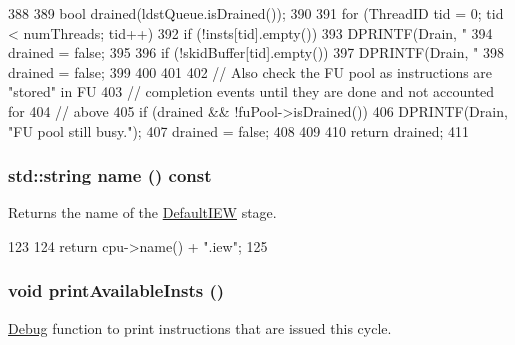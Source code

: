\begin{DoxyCode}
388 {
389     bool drained(ldstQueue.isDrained());
390 
391     for (ThreadID tid = 0; tid < numThreads; tid++) {
392         if (!insts[tid].empty()) {
393             DPRINTF(Drain, "%
394             drained = false;
395         }
396         if (!skidBuffer[tid].empty()) {
397             DPRINTF(Drain, "%
398             drained = false;
399         }
400     }
401 
402     // Also check the FU pool as instructions are "stored" in FU
403     // completion events until they are done and not accounted for
404     // above
405     if (drained && !fuPool->isDrained()) {
406         DPRINTF(Drain, "FU pool still busy.\n");
407         drained = false;
408     }
409 
410     return drained;
411 }
\end{DoxyCode}
\hypertarget{classDefaultIEW_a37627d5d5bba7f4a8690c71c2ab3cb07}{
\subsubsection[{name}]{\setlength{\rightskip}{0pt plus 5cm}std::string name () const}}
\label{classDefaultIEW_a37627d5d5bba7f4a8690c71c2ab3cb07}
Returns the name of the \hyperlink{classDefaultIEW}{DefaultIEW} stage. 


\begin{DoxyCode}
123 {
124     return cpu->name() + ".iew";
125 }
\end{DoxyCode}
\hypertarget{classDefaultIEW_a8336a7a280f893bc1225d7b1ce234106}{
\subsubsection[{printAvailableInsts}]{\setlength{\rightskip}{0pt plus 5cm}void printAvailableInsts ()}}
\label{classDefaultIEW_a8336a7a280f893bc1225d7b1ce234106}
\hyperlink{namespaceDebug}{Debug} function to print instructions that are issued this cycle. 


